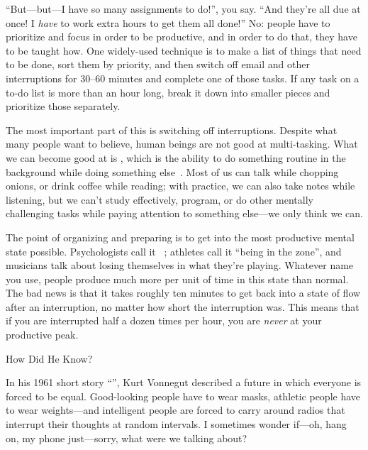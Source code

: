 ``But---but---I have so many assignments to do!'', you say.
``And they're all due at once!
I \emph{have} to work extra hours to get them all done!''
No:
people have to prioritize and focus in order to be productive,
and in order to do that,
they have to be taught how.
One widely-used technique is to make a list of things that need to be done,
sort them by priority,
and then switch off email and other interruptions for 30--60 minutes
and complete one of those tasks.
If any task on a to-do list is more than an hour long,
break it down into smaller pieces and prioritize those separately.

The most important part of this is switching off interruptions.
Despite what many people want to believe,
human beings are not good at multi-tasking.
What we can become good at is ,
which is the ability to do something routine in the background
while doing something else~\cite{Mill2016a}.
Most of us can talk while chopping onions,
or drink coffee while reading;
with practice,
we can also take notes while listening,
but we can't study effectively,
program,
or do other mentally challenging tasks while paying attention to something else---we
only think we can.

The point of organizing and preparing is
to get into the most productive mental state possible.
Psychologists call it ~\cite{Csik2008};
athletes call it ``being in the zone'',
and musicians talk about losing themselves in what they're playing.
Whatever name you use,
people produce much more per unit of time in this state than normal.
The bad news is that
it takes roughly ten minutes to get back into a state of flow after an interruption,
no matter how short the interruption was.
This means that if you are interrupted half a dozen times per hour,
you are \emph{never} at your productive peak.

\newpage

\begin{aside}{How Did He Know?}

  In his 1961 short story ``'',
  Kurt Vonnegut described a future in which everyone is forced to be equal.
  Good-looking people have to wear masks,
  athletic people have to wear weights---and intelligent people
  are forced to carry around radios that interrupt their thoughts at random intervals.
  I sometimes wonder if---oh, hang on, my phone just---sorry, what were we talking about?

\end{aside}

